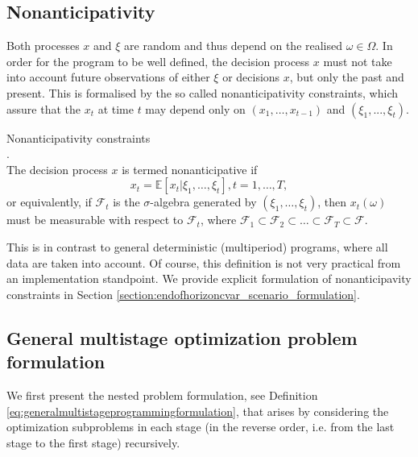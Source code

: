 \subsection{Nonanticipativity}
Both processes $x$ and $\xi$ are random and thus depend on the realised $\omega \in \Omega$. In order for the program to be well defined, the decision process $x$ must not take into account future observations of either
$\xi$ or decisions $x$, but only the past and present. This is formalised by the so called nonanticipativity constraints, which assure that the $x_t$ at time $t$ may depend only on $(x_1,\dots,x_{t-1})$ and $(\xi_1,...,\xi_{t})$.

\begin{defn}{Nonanticipativity constraints} \label{def:nonanticipativity constraints}
\\
\cite[Section 3.3.]{stochasticprogrammingbible}. \\
The decision process $x$ is termed nonanticipative if
\begin{equation*}
x_t=\mathbb{E}\left[x_t|\xi_1,\dots,\xi_t \right], t=1,\dots,T,
\end{equation*}
or equivalently, if $\mathcal{F}_t$ is the $\sigma$-algebra generated by $(\xi_1,\dots,\xi_t)$, then $x_t(\omega)$ must be measurable with respect to $\mathcal{F}_t$, where $\mathcal{F}_1 \subset \mathcal{F}_2 \subset \dots \subset \mathcal{F}_T \subset \mathcal{F}$.
\end{defn}
This is in contrast to general deterministic (multiperiod) programs, where all data are taken into account. Of course, this definition is not very practical from an implementation standpoint. We provide explicit formulation of nonanticipavity constraints in Section \ref{section:endofhorizoncvar_scenario_formulation}.

\subsection{General multistage optimization problem formulation}
We first present the nested problem formulation, see Definition \ref{eq:generalmultistageprogrammingformulation}, that arises by considering the optimization subproblems in each stage (in the reverse order, i.e. from the last stage to the first stage) recursively.


